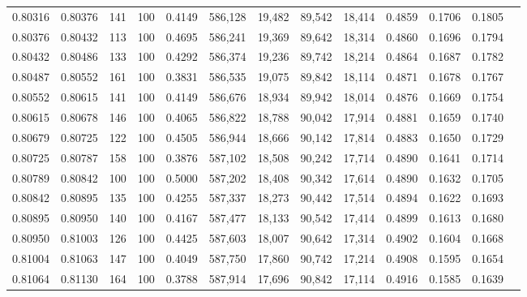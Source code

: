 \begin{tabular}{rrrrrrrrrrrrr}
0.80316 & 0.80376 &   141 & 100 &                                     0.4149 & 586,128 &  19,482 &  89,542 &  18,414 & 0.4859 & 0.1706 & 0.1805 \\
0.80376 & 0.80432 &   113 & 100 &                                     0.4695 & 586,241 &  19,369 &  89,642 &  18,314 & 0.4860 & 0.1696 & 0.1794 \\
0.80432 & 0.80486 &   133 & 100 &                                     0.4292 & 586,374 &  19,236 &  89,742 &  18,214 & 0.4864 & 0.1687 & 0.1782 \\
0.80487 & 0.80552 &   161 & 100 &                                     0.3831 & 586,535 &  19,075 &  89,842 &  18,114 & 0.4871 & 0.1678 & 0.1767 \\
0.80552 & 0.80615 &   141 & 100 &                                     0.4149 & 586,676 &  18,934 &  89,942 &  18,014 & 0.4876 & 0.1669 & 0.1754 \\
0.80615 & 0.80678 &   146 & 100 &                                     0.4065 & 586,822 &  18,788 &  90,042 &  17,914 & 0.4881 & 0.1659 & 0.1740 \\
0.80679 & 0.80725 &   122 & 100 &                                     0.4505 & 586,944 &  18,666 &  90,142 &  17,814 & 0.4883 & 0.1650 & 0.1729 \\
0.80725 & 0.80787 &   158 & 100 &                                     0.3876 & 587,102 &  18,508 &  90,242 &  17,714 & 0.4890 & 0.1641 & 0.1714 \\
0.80789 & 0.80842 &   100 & 100 &                                     0.5000 & 587,202 &  18,408 &  90,342 &  17,614 & 0.4890 & 0.1632 & 0.1705 \\
0.80842 & 0.80895 &   135 & 100 &                                     0.4255 & 587,337 &  18,273 &  90,442 &  17,514 & 0.4894 & 0.1622 & 0.1693 \\
0.80895 & 0.80950 &   140 & 100 &                                     0.4167 & 587,477 &  18,133 &  90,542 &  17,414 & 0.4899 & 0.1613 & 0.1680 \\
0.80950 & 0.81003 &   126 & 100 &                                     0.4425 & 587,603 &  18,007 &  90,642 &  17,314 & 0.4902 & 0.1604 & 0.1668 \\
0.81004 & 0.81063 &   147 & 100 &                                     0.4049 & 587,750 &  17,860 &  90,742 &  17,214 & 0.4908 & 0.1595 & 0.1654 \\
0.81064 & 0.81130 &   164 & 100 &                                     0.3788 & 587,914 &  17,696 &  90,842 &  17,114 & 0.4916 & 0.1585 & 0.1639 \\

\end{tabular}
